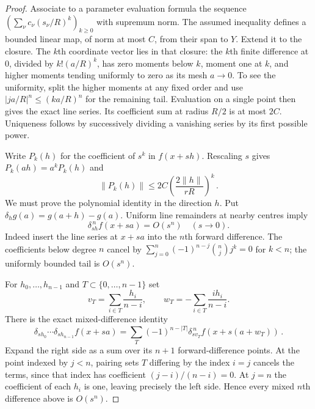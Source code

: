 \begin{proof}
Associate to a parameter evaluation formula the sequence $(\sum_\nu c_\nu(s_\nu/R)^k)_{k\ge0}$ with supremum norm. The assumed inequality defines a bounded linear map, of norm at most $C$, from their span to $Y$. Extend it to the closure. The $k$th coordinate vector lies in that closure: the $k$th finite difference at $0$, divided by $k! (a/R)^k$, has zero moments below $k$, moment one at $k$, and higher moments tending uniformly to zero as its mesh $a\to0$. To see the uniformity, split the higher moments at any fixed order and use $|ja/R|^n\le(ka/R)^n$ for the remaining tail. Evaluation on a single point then gives the exact line series. Its coefficient sum at radius $R/2$ is at most $2C$. Uniqueness follows by successively dividing a vanishing series by its first possible power.

Write $P_k(h)$ for the coefficient of $s^k$ in $f(x+sh)$. Rescaling $s$ gives $P_k(ah)=a^kP_k(h)$ and
\begin{equation*}
\|P_k(h)\|\le2C\left(\frac{2\|h\|}{rR}\right)^k\,.
\end{equation*}
We must prove the polynomial identity in the direction $h$. Put $\delta_hg(a)=g(a+h)-g(a)$. Uniform line remainders at nearby centres imply
\begin{equation*}
\delta_{sh}^{\,n}f(x+sa)=O(s^n)\quad(s\to0).
\end{equation*}
Indeed insert the line series at $x+sa$ into the $n$th forward difference. The coefficients below degree $n$ cancel by $\sum_{j=0}^n(-1)^{n-j}\binom nj j^k=0$ for $k<n$; the uniformly bounded tail is $O(s^n)$.

For $h_0,\ldots,h_{n-1}$ and $T\subset\{0,\ldots,n-1\}$ set
\begin{equation*}
v_T=\sum_{i\in T}\frac{h_i}{n-i},\qquad
w_T=-\sum_{i\in T}\frac{i h_i}{n-i}.
\end{equation*}
There is the exact mixed-difference identity
\begin{equation}\label{eq:D-mixed-difference}
\delta_{sh_0}\cdots\delta_{sh_{n-1}}f(x+sa)
=\sum_T(-1)^{n-|T|}\delta_{sv_T}^{\,n}f(x+s(a+w_T))\,.
\end{equation}
Expand the right side as a sum over its $n+1$ forward-difference points. At the point indexed by $j<n$, pairing sets $T$ differing by the index $i=j$ cancels the terms, since that index has coefficient $(j-i)/(n-i)=0$. At $j=n$ the coefficient of each $h_i$ is one, leaving precisely the left side. Hence every mixed $n$th difference above is $O(s^n)$.


\end{proof}
